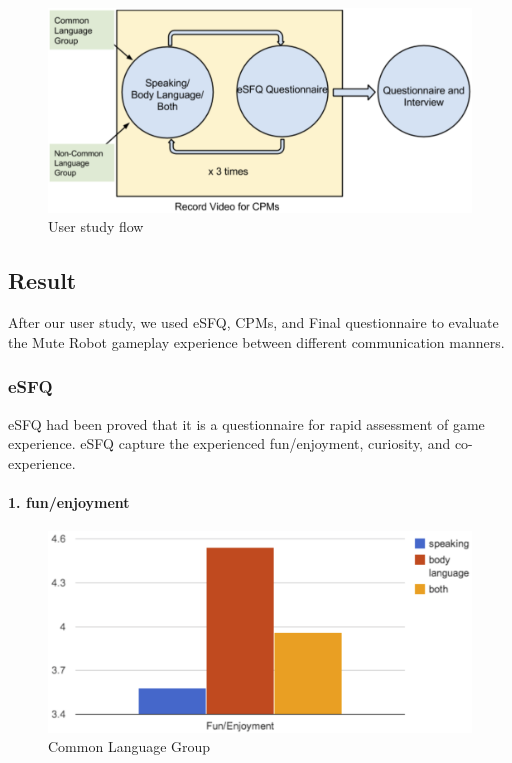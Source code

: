 \begin{figure}[!h]
\centering
\includegraphics[width=0.9\columnwidth]{Figures/US_F1.png}
\caption{User study flow}
\label{fig:US1}
\end{figure}

\subsection{Result}
After our user study, we used eSFQ, CPMs, and Final questionnaire to evaluate the Mute Robot gameplay experience between different communication manners.

\subsubsection{eSFQ}
eSFQ\cite{eSFQ} had been proved that it is a questionnaire for rapid assessment of game experience. eSFQ capture the experienced fun/enjoyment, curiosity, and co-experience. 

\paragraph{1. fun/enjoyment}

\begin{figure}[!h]
\centering
\includegraphics[width=0.9\columnwidth]{Figures/US_Fun_Com.png}
\caption{Common Language Group}
\label{fig:US_Fun_Com}
\end{figure}

